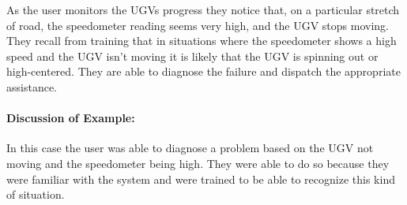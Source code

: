 As the user monitors the UGVs progress they notice that, on a particular stretch of road, the speedometer reading seems very high, and the UGV stops moving. They recall from training that in situations where the speedometer shows a high speed and the UGV isn't moving it is likely that the UGV is spinning out or high-centered. They are able to diagnose the failure and dispatch the appropriate assistance.

\paragraph{\textbf{Discussion of Example:}} In this case the user was able to diagnose a problem based on the UGV not moving and the speedometer being high. They were able to do so because they were familiar with the system and were trained to be able to recognize this kind of situation.
